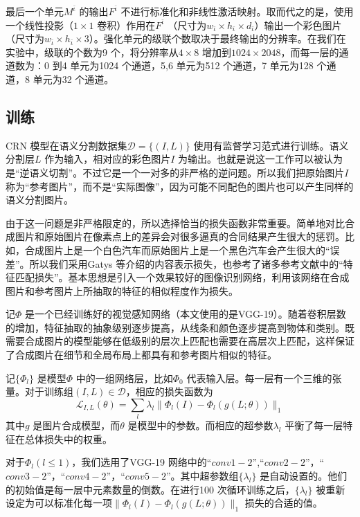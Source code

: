 \documentclass{ctexart}
\begin{document}
            最后一个单元$M^{\bar{\iota}}$ 的输出$F^{\bar{\iota}}$ 不进行标准化和非线性激活映射。取而代之的是，使用一个线性投影（$1\times 1$ 卷积）作用在$F^{\bar{\iota}}$ （尺寸为$w_{\bar{\iota}} \times h_{\bar{\iota}} \times d_{\bar{\iota}}$）输出一个彩色图片（尺寸为$w_{\bar{\iota}}\times h_{\bar{\iota}} \times 3$）。强化单元的级联个数取决于最终输出的分辨率。在我们在实验中，级联的个数为9 个，将分辨率从$4\times 8$ 增加到$1024\times 2048$，而每一层的通道数为：0 到4 单元为1024 个通道，5,6 单元为512 个通道，7 单元为128 个通道，8 单元为32 个通道。

        \subsection{训练}
            CRN 模型在语义分割数据集$\mathcal{D}=\{(I,L)\}$ 使用有监督学习范式进行训练。语义分割层$L$ 作为输入，相对应的彩色图片$I$ 为输出。也就是说这一工作可以被认为是“逆语义切割”。不过它是一个一对多的非严格的逆问题。所以我们把原始图片$I$ 称为“参考图片”，而不是“实际图像”，因为可能不同配色的图片也可以产生同样的语义分割图片。

            由于这一问题是非严格限定的，所以选择恰当的损失函数非常重要。简单地对比合成图片和原始图片在像素点上的差异会对很多逼真的合同结果产生很大的惩罚。比如，合成图片上是一个白色汽车而原始图片上是一个黑色汽车会产生很大的“误差”。所以我们采用Gatys 等介绍的内容表示损失，也参考了诸多参考文献中的“特征匹配损失”。基本思想是引入一个效果较好的图像识别网络，利用该网络在合成图片和参考图片上所抽取的特征的相似程度作为损失。

            记$\Phi$ 是一个已经训练好的视觉感知网络（本文使用的是VGG-19）。随着卷积层数的增加，特征抽取的抽象级别逐步提高，从线条和颜色逐步提高到物体和类别。既需要合成图片的模型能够在低级别的层次上匹配也需要在高层次上匹配，这样保证了合成图片在细节和全局布局上都具有和参考图片相似的特征。

            记$\{\Phi_l\}$ 是模型$\Phi$ 中的一组网络层，比如$\Phi_0$ 代表输入层。每一层有一个三维的张量。对于训练组$(I,L)\in \mathcal{D}$，相应的损失函数为
            \begin{equation}
                \mathcal{L}_{I,L}(\theta) = \sum_l \lambda_l \|\Phi_l(I) - \Phi_l(g(L;\theta))\|_1
            \end{equation}
            其中$g$ 是图片合成模型，而$\theta$ 是模型中的参数。而相应的超参数$\lambda_l$ 平衡了每一层特征在总体损失中的权重。

            对于$\Phi_l(l \le 1)$，我们选用了VGG-19 网络中的“$conv1-2$”,“$conv2-2$”，“$conv3-2$”，“$conv4-2$”，“$conv5-2$”。其中超参数组$\{\lambda_l\}$ 是自动设置的。他们的初始值是每一层中元素数量的倒数。在进行100 次循环训练之后，$\{\lambda_l\}$ 被重新设定为可以标准化每一项$\|\Phi_l(I) - \Phi_l(g(L;\theta))\|_1$ 损失的合适的值。
\end{document}
